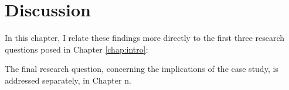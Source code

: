 

\chapter{Discussion} \label{chap:discussion}

    In this chapter, I relate these findings more directly to the first three research questions posed in Chapter \ref{chap:intro}:
    
    
    
    
    
    The final research question, concerning the implications of the case study, is addressed separately, in Chapter n.
    





